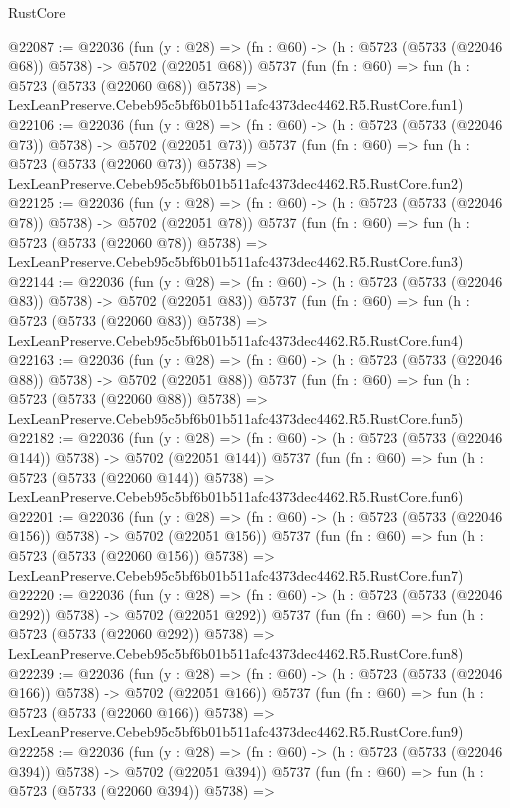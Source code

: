 \begin{lexlean}{RustCore}
\begin{coremodule}
@22087 := @22036
    (fun (y : @28) => (fn : @60) -> (h : @5723 (@5733 (@22046 @68)) @5738) -> @5702 (@22051 @68))
    @5737
    (fun (fn : @60) =>
    fun (h : @5723 (@5733 (@22060 @68)) @5738) =>
    LexLeanPreserve.Cebeb95c5bf6b01b511afc4373dec4462.R5.RustCore.fun1)
@22106 := @22036
    (fun (y : @28) => (fn : @60) -> (h : @5723 (@5733 (@22046 @73)) @5738) -> @5702 (@22051 @73))
    @5737
    (fun (fn : @60) =>
    fun (h : @5723 (@5733 (@22060 @73)) @5738) =>
    LexLeanPreserve.Cebeb95c5bf6b01b511afc4373dec4462.R5.RustCore.fun2)
@22125 := @22036
    (fun (y : @28) => (fn : @60) -> (h : @5723 (@5733 (@22046 @78)) @5738) -> @5702 (@22051 @78))
    @5737
    (fun (fn : @60) =>
    fun (h : @5723 (@5733 (@22060 @78)) @5738) =>
    LexLeanPreserve.Cebeb95c5bf6b01b511afc4373dec4462.R5.RustCore.fun3)
@22144 := @22036
    (fun (y : @28) => (fn : @60) -> (h : @5723 (@5733 (@22046 @83)) @5738) -> @5702 (@22051 @83))
    @5737
    (fun (fn : @60) =>
    fun (h : @5723 (@5733 (@22060 @83)) @5738) =>
    LexLeanPreserve.Cebeb95c5bf6b01b511afc4373dec4462.R5.RustCore.fun4)
@22163 := @22036
    (fun (y : @28) => (fn : @60) -> (h : @5723 (@5733 (@22046 @88)) @5738) -> @5702 (@22051 @88))
    @5737
    (fun (fn : @60) =>
    fun (h : @5723 (@5733 (@22060 @88)) @5738) =>
    LexLeanPreserve.Cebeb95c5bf6b01b511afc4373dec4462.R5.RustCore.fun5)
@22182 := @22036
    (fun (y : @28) => (fn : @60) -> (h : @5723 (@5733 (@22046 @144)) @5738) -> @5702 (@22051 @144))
    @5737
    (fun (fn : @60) =>
    fun (h : @5723 (@5733 (@22060 @144)) @5738) =>
    LexLeanPreserve.Cebeb95c5bf6b01b511afc4373dec4462.R5.RustCore.fun6)
@22201 := @22036
    (fun (y : @28) => (fn : @60) -> (h : @5723 (@5733 (@22046 @156)) @5738) -> @5702 (@22051 @156))
    @5737
    (fun (fn : @60) =>
    fun (h : @5723 (@5733 (@22060 @156)) @5738) =>
    LexLeanPreserve.Cebeb95c5bf6b01b511afc4373dec4462.R5.RustCore.fun7)
@22220 := @22036
    (fun (y : @28) => (fn : @60) -> (h : @5723 (@5733 (@22046 @292)) @5738) -> @5702 (@22051 @292))
    @5737
    (fun (fn : @60) =>
    fun (h : @5723 (@5733 (@22060 @292)) @5738) =>
    LexLeanPreserve.Cebeb95c5bf6b01b511afc4373dec4462.R5.RustCore.fun8)
@22239 := @22036
    (fun (y : @28) => (fn : @60) -> (h : @5723 (@5733 (@22046 @166)) @5738) -> @5702 (@22051 @166))
    @5737
    (fun (fn : @60) =>
    fun (h : @5723 (@5733 (@22060 @166)) @5738) =>
    LexLeanPreserve.Cebeb95c5bf6b01b511afc4373dec4462.R5.RustCore.fun9)
@22258 := @22036
    (fun (y : @28) => (fn : @60) -> (h : @5723 (@5733 (@22046 @394)) @5738) -> @5702 (@22051 @394))
    @5737
    (fun (fn : @60) =>
    fun (h : @5723 (@5733 (@22060 @394)) @5738) =>

\end{coremodule}
\end{lexlean}

